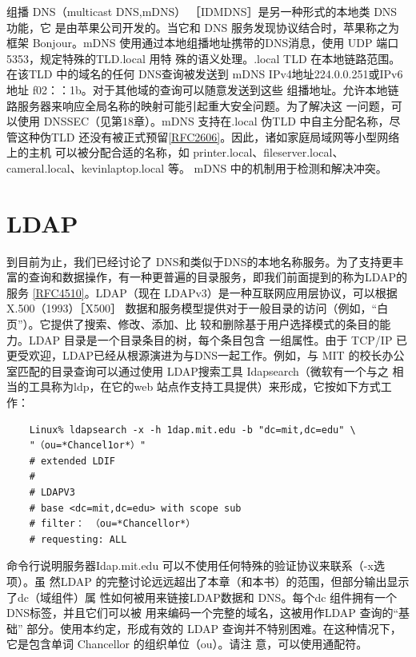 组播 DNS（multicast DNS,mDNS） ［IDMDNS］是另一种形式的本地类 DNS 功能，它
是由苹果公司开发的。当它和 DNS 服务发现协议结合时，苹果称之为框架 Bonjour。mDNS
使用通过本地组播地址携带的DNS消息，使用 UDP 端口 5353，规定特殊的TLD.local 用特
殊的语义处理。.local TLD 在本地链路范围。在该TLD 中的域名的任何 DNS查询被发送到
mDNS IPv4地址224.0.0.251或IPv6地址 f02：：1b。对于其他域的查询可以随意发送到这些
组播地址。允许本地链路服务器来响应全局名称的映射可能引起重大安全问题。为了解决这
一问题，可以使用 DNSSEC（见第18章）。mDNS 支持在.local 伪TLD 中自主分配名称，尽
管这种伪TLD 还没有被正式预留\href{https://www.rfc-editor.org/rfc/rfc2606}{[RFC2606]}。因此，诸如家庭局域网等小型网络上的主机
可以被分配合适的名称，如 printer.local、fileserver.local、cameral.local、kevinlaptop.local 等。
mDNS 中的机制用于检测和解决冲突。

\section{LDAP}

到目前为止，我们已经讨论了 DNS和类似于DNS的本地名称服务。为了支持更丰
富的查询和数据操作，有一种更普遍的目录服务，即我们前面提到的称为LDAP的服务
\href{https://www.rfc-editor.org/rfc/rfc4510}{[RFC4510]}。LDAP（现在 LDAPv3）是一种互联网应用层协议，可以根据 X.500（1993）［X500］
数据和服务模型提供对于一般目录的访问（例如，“白页”）。它提供了搜索、修改、添加、比
较和删除基于用户选择模式的条目的能力。LDAP 目录是一个目录条目的树，每个条目包含
一组属性。由于 TCP/IP 已更受欢迎，LDAP已经从根源演进为与DNS一起工作。例如，与
MIT 的校长办公室匹配的目录查询可以通过使用 LDAP搜索工具 Idapsearch（微软有一个与之
相当的工具称为ldp，在它的web 站点作支持工具提供）来形成，它按如下方式工作：

\begin{verbatim}
    Linux% ldapsearch -x -h 1dap.mit.edu -b "dc=mit,dc=edu" \
    "（ou=*Chancel1or*）"
    # extended LDIF
    #
    # LDAPV3
    # base <dc=mit,dc=edu> with scope sub
    # filter： （ou=*Chancellor*）
    # requesting: ALL
\end{verbatim}

命令行说明服务器Idap.mit.edu 可以不使用任何特殊的验证协议来联系（-x选项）。虽
然LDAP 的完整讨论远远超出了本章（和本书）的范围，但部分输出显示了dc（域组件）属
性如何被用来链接LDAP数据和 DNS。每个dc 组件拥有一个 DNS标签，并且它们可以被
用来编码一个完整的域名，这被用作LDAP 查询的“基础” 部分。使用本约定，形成有效的
LDAP 查询并不特别困难。在这种情况下，它是包含单词 Chancellor 的组织单位（ou）。请注
意，可以使用通配符。


